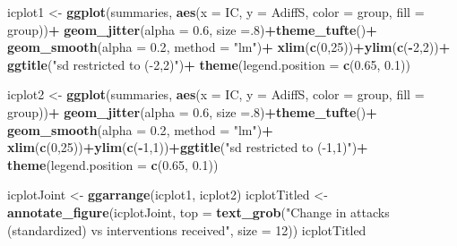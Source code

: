 \documentclass[10pt,dvipsnames,enabledeprecatedfontcommands]{scrartcl}
\newenvironment{Shaded}{\begin{snugshade}}{\end{snugshade}}
\newcommand{\DataTypeTok}[1]{\textcolor[rgb]{0.13,0.29,0.53}{#1}}
\newcommand{\DecValTok}[1]{\textcolor[rgb]{0.00,0.00,0.81}{#1}}
\newcommand{\FloatTok}[1]{\textcolor[rgb]{0.00,0.00,0.81}{#1}}
\newcommand{\KeywordTok}[1]{\textcolor[rgb]{0.13,0.29,0.53}{\textbf{#1}}}
\newcommand{\NormalTok}[1]{#1}
\newcommand{\OperatorTok}[1]{\textcolor[rgb]{0.81,0.36,0.00}{\textbf{#1}}}
\newcommand{\StringTok}[1]{\textcolor[rgb]{0.31,0.60,0.02}{#1}}
\begin{document}
\begin{Shaded}
\begin{Highlighting}[]
\NormalTok{icplot1 <-}\StringTok{ }\KeywordTok{ggplot}\NormalTok{(summaries, }\KeywordTok{aes}\NormalTok{(}\DataTypeTok{x =}\NormalTok{ IC, }\DataTypeTok{y =}\NormalTok{ AdiffS, }\DataTypeTok{color =}\NormalTok{ group, }\DataTypeTok{fill =}\NormalTok{ group))}\OperatorTok{+}
\StringTok{  }\KeywordTok{geom_jitter}\NormalTok{(}\DataTypeTok{alpha =} \FloatTok{0.6}\NormalTok{, }\DataTypeTok{size =}\NormalTok{.}\DecValTok{8}\NormalTok{)}\OperatorTok{+}\KeywordTok{theme_tufte}\NormalTok{()}\OperatorTok{+}
\StringTok{  }\KeywordTok{geom_smooth}\NormalTok{(}\DataTypeTok{alpha =} \FloatTok{0.2}\NormalTok{, }\DataTypeTok{method =} \StringTok{"lm"}\NormalTok{)}\OperatorTok{+}
\StringTok{  }\KeywordTok{xlim}\NormalTok{(}\KeywordTok{c}\NormalTok{(}\DecValTok{0}\NormalTok{,}\DecValTok{25}\NormalTok{))}\OperatorTok{+}\KeywordTok{ylim}\NormalTok{(}\KeywordTok{c}\NormalTok{(}\OperatorTok{-}\DecValTok{2}\NormalTok{,}\DecValTok{2}\NormalTok{))}\OperatorTok{+}
\StringTok{  }\KeywordTok{ggtitle}\NormalTok{(}\StringTok{"sd restricted to (-2,2)"}\NormalTok{)}\OperatorTok{+}
\StringTok{  }\KeywordTok{theme}\NormalTok{(}\DataTypeTok{legend.position =} \KeywordTok{c}\NormalTok{(}\FloatTok{0.65}\NormalTok{, }\FloatTok{0.1}\NormalTok{))}

\NormalTok{icplot2 <-}\StringTok{  }\KeywordTok{ggplot}\NormalTok{(summaries, }\KeywordTok{aes}\NormalTok{(}\DataTypeTok{x =}\NormalTok{ IC, }\DataTypeTok{y =}\NormalTok{ AdiffS, }\DataTypeTok{color =}\NormalTok{ group, }\DataTypeTok{fill =}\NormalTok{ group))}\OperatorTok{+}
\StringTok{  }\KeywordTok{geom_jitter}\NormalTok{(}\DataTypeTok{alpha =} \FloatTok{0.6}\NormalTok{, }\DataTypeTok{size =}\NormalTok{.}\DecValTok{8}\NormalTok{)}\OperatorTok{+}\KeywordTok{theme_tufte}\NormalTok{()}\OperatorTok{+}
\StringTok{  }\KeywordTok{geom_smooth}\NormalTok{(}\DataTypeTok{alpha =} \FloatTok{0.2}\NormalTok{, }\DataTypeTok{method =} \StringTok{"lm"}\NormalTok{)}\OperatorTok{+}
\StringTok{  }\KeywordTok{xlim}\NormalTok{(}\KeywordTok{c}\NormalTok{(}\DecValTok{0}\NormalTok{,}\DecValTok{25}\NormalTok{))}\OperatorTok{+}\KeywordTok{ylim}\NormalTok{(}\KeywordTok{c}\NormalTok{(}\OperatorTok{-}\DecValTok{1}\NormalTok{,}\DecValTok{1}\NormalTok{))}\OperatorTok{+}\KeywordTok{ggtitle}\NormalTok{(}\StringTok{"sd restricted to (-1,1)"}\NormalTok{)}\OperatorTok{+}
\StringTok{  }\KeywordTok{theme}\NormalTok{(}\DataTypeTok{legend.position =} \KeywordTok{c}\NormalTok{(}\FloatTok{0.65}\NormalTok{, }\FloatTok{0.1}\NormalTok{))}

\NormalTok{icplotJoint <-}\StringTok{ }\KeywordTok{ggarrange}\NormalTok{(icplot1, icplot2) }
\NormalTok{icplotTitled <-}\StringTok{ }\KeywordTok{annotate_figure}\NormalTok{(icplotJoint, }
  \DataTypeTok{top =} \KeywordTok{text_grob}\NormalTok{(}\StringTok{"Change in attacks (standardized) vs interventions received"}\NormalTok{,  }\DataTypeTok{size =} \DecValTok{12}\NormalTok{))}
\NormalTok{icplotTitled}
\end{Highlighting}
\end{Shaded}
\end{document}
